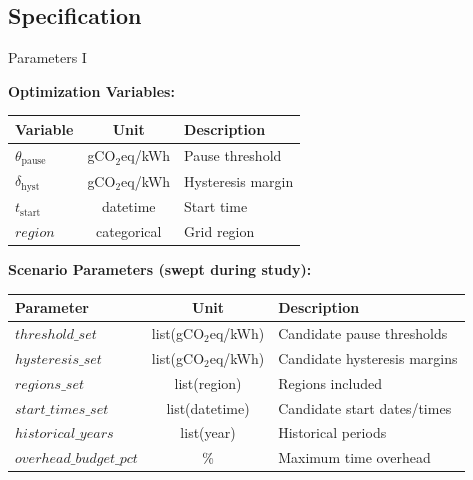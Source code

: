 \subsection{Specification}

\begin{frame}[t]{Parameters I}{}

  \small

  \textbf{Optimization Variables:}
  \newline
  \begin{tabular}{l|c|l}
    \toprule
    Variable & Unit & Description \\
    \midrule
    $\theta_{\text{pause}}$ & gCO$_2$eq/kWh & Pause threshold \\
    $\delta_{\text{hyst}}$ & gCO$_2$eq/kWh & Hysteresis margin \\
    $t_{\text{start}}$ & datetime & Start time \\
    $\mathit{region}$ & categorical & Grid region \\
    \bottomrule
  \end{tabular}%

  \vspace{1cm}

  \textbf{Scenario Parameters (swept during study):}
  \newline
  \begin{tabular}{l|c|l}
    \toprule
    Parameter & Unit & Description \\
    \midrule
    $\mathit{threshold\_set}$ & list(gCO$_2$eq/kWh) & Candidate pause
    thresholds \\
    $\mathit{hysteresis\_set}$ & list(gCO$_2$eq/kWh) & Candidate
    hysteresis margins \\
    $\mathit{regions\_set}$ & list(region) & Regions included \\
    $\mathit{start\_times\_set}$ & list(datetime) & Candidate start
    dates/times \\
    $\mathit{historical\_years}$ & list(year) & Historical periods \\
    $\mathit{overhead\_budget\_pct}$ & \% & Maximum time overhead \\
    \bottomrule
  \end{tabular}%

\end{frame}
